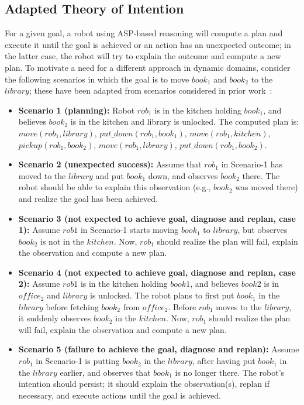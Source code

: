 \documentclass[letterpaper, 10 pt, conference]{article}  %
\begin{document}
\subsection{Adapted Theory of Intention}
\label{sec:arch-toi}
For a given goal, a robot using ASP-based reasoning will compute a
plan and execute it until the goal is achieved or an action has an
unexpected outcome; in the latter case, the robot will try to explain
the outcome and compute a new plan. To motivate a need for a different
approach in dynamic domains, consider the following scenarios in which
the goal is to move $book_1$ and $book_2$ to the $library$; these have
been adapted from scenarios considered in prior
work~\cite{blount2015theory}:
\begin{itemize}
\item \textbf{Scenario 1 (planning):} Robot $rob_1$ is in the kitchen
  holding $book_1$, and believes $book_2$ is in the kitchen and
  library is unlocked. The computed plan is: $move(rob_1, library)$,
  $put\_down(rob_1, book_1)$, $move(rob_1, kitchen)$, $pickup(rob_1,
  book_2)$, $move(rob_1, library)$, $put\_down(rob_1, book_2)$.

\item \textbf{Scenario 2 (unexpected success):} Assume that $rob_1$ in
  Scenario-1 has moved to the $library$ and put $book_1$ down, and
  observes $book_2$ there. The robot should be able to explain this
  observation (e.g., $book_2$ was moved there) and realize the goal
  has been achieved.

\item \textbf{Scenario 3 (not expected to achieve goal, diagnose and
    replan, case 1):} Assume $rob1$ in Scenario-1 starts moving
  $book_1$ to $library$, but observes $book_2$ is not in the
  $kitchen$.  Now, $rob_1$ should realize the plan will fail, explain
  the observation and compute a new plan.

\item \textbf{Scenario 4 (not expected to achieve goal, diagnose and
    replan, case 2):} Assume $rob1$ is in the kitchen holding $book1$,
  and believes $book2$ is in $office_2$ and $library$ is unlocked. The
  robot plans to first put $book_1$ in the $library$ before fetching
  $book_2$ from $office_2$. Before $rob_1$ moves to the $library$, it
  suddenly observes $book_2$ in the $kitchen$.  Now, $rob_1$ should
  realize the plan will fail, explain the observation and compute a
  new plan.

\item \textbf{Scenario 5 (failure to achieve the goal, diagnose and
    replan):} Assume $rob_1$ in Scenario-1 is putting $book_2$ in the
  $library$, after having put $book_1$ in the $library$ earlier, and
  observes that $book_1$ is no longer there. The robot's intention
  should persist; it should explain the observation(s), replan if
  necessary, and execute actions until the goal is achieved.


\end{itemize}
\end{document}
